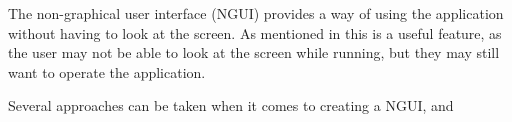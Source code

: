 The non-graphical user interface (NGUI) provides a way of using the application without having to look at the screen. As mentioned in  this is a useful feature, as the user may not be able to look at the screen while running, but they may still want to operate the application.

Several approaches can be taken when it comes to creating a NGUI, and 
